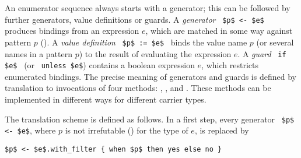 An enumerator sequence always starts with a generator; this can be followed by further generators, value definitions or guards. A {\em generator} ~\lstinline!$p$ <- $e$!~ produces bindings from an expression $e$, which are matched in some way against pattern $p$ (). A {\em value definition} ~\lstinline!$p$ := $e$!~ binds the value name $p$ (or several names in a pattern $p$) to the result of evaluating the expression $e$. A {\em guard} ~\lstinline!if $e$!~ (or ~\lstinline!unless $e$!) contains a boolean expression $e$, which restricts enumerated bindings. The precise meaning of generators and guards is defined by translation to invocations of four methods: , ,  and . These methods can be implemented in different ways for different carrier types.

The translation scheme is defined as follows. In a first step, every generator ~\lstinline!$p$ <- $e$!, where $p$ is not irrefutable () for the type of $e$, is replaced by 
\begin{lstlisting}
$p$ <- $e$.with_filter { when $p$ then yes else no }
\end{lstlisting}

